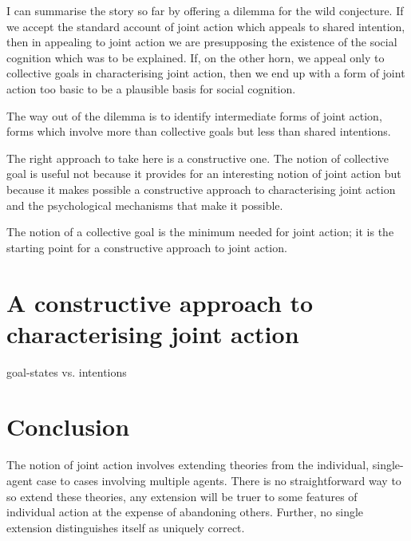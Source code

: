 \documentclass[12pt,a4paper]{extarticle}
\begin{document}
I can summarise the story so far by offering a dilemma for the wild conjecture.  If we accept the standard account of joint action which appeals to shared intention, then in appealing to joint action we are presupposing the existence of the social cognition which was to be explained.  If, on the other horn, we appeal only to collective goals in characterising joint action, then we end up with a form of joint action too basic to be a plausible basis for social cognition.

The way out of the dilemma is to identify intermediate forms of joint action, forms which involve more than collective goals but less than shared intentions.

The right approach to take here is a constructive one.  The notion of collective goal is useful not because it provides for an interesting notion of joint action but because it makes possible a constructive approach to characterising joint action and the psychological mechanisms that make it possible.

The notion of a collective goal is the minimum needed for joint action; it is the starting point for a constructive approach to joint action.  



\section{A constructive approach to characterising joint action}

goal-states vs. intentions


\section{Conclusion}
The notion of joint action involves extending theories from the individual, single-agent case to cases involving multiple agents.  There is no straightforward way to so extend these theories, any extension will be truer to some features of individual action at the expense of abandoning others.  Further, no single extension distinguishes itself as uniquely correct.

 


\end{document}
